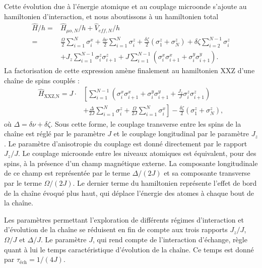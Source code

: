 Cette évolution due à l'énergie atomique et au couplage microonde s'ajoute au hamiltonien d'interaction, et nous aboutissons à un hamiltonien total
%
\begin{equation}
\label{eq:hamilt_tot_N}
\begin{aligned}
\hat{H}/h =& %
\hat{H}_{\mu o,N}/h + \hat{V}_{eff,N}/h \\
=&
\frac{\Omega}{2}\sum_{i=1}^{N}\sigma_i^x +
\frac{\delta\nu}{2}\sum_{i=1}^{N}\sigma_i^z 
+\frac{\delta\zeta}{2} \left( \sigma_1^z + \sigma_N^z \right)
+ \delta\zeta \sum_{i=2}^{N-1} \sigma_i^z \\
&+ J_z \sum_{i=1}^{N-1} \sigma_i^z \sigma_{i+1}^z
+ J \sum_{i=1}^{N-1} \left( \sigma_i^x \sigma_{i+1}^x + \sigma_i^y \sigma_{i+1}^y \right).
\end{aligned}
\end{equation}
%
La factorisation de cette expression amène finalement au hamiltonien \og XXZ \fg{} d'une chaîne de spins couplés :
\begin{equation}
\label{eq:XXZ_Natoms}
\begin{aligned}
\hat{H}_{\text{XXZ,N}} =
J\cdot & \left[
\sum_{i=1}^{N-1} \left( \sigma_i^x\sigma_{i+1}^x 
+ \sigma_i^y \sigma_{i+1}^y
+ \frac{J_z}{J} \sigma_i^z\sigma_{i+1}^z \right) \right. \\
&\left. + \frac{\Delta}{2J}\sum_{i=1}^{N} \sigma_i^z
+ \frac{\Omega}{2J}\sum_{i=1}^{N} \sigma_i^x \right]
- \frac{\delta\zeta}{2}\left( \sigma_1^z + \sigma_N^z \right),
\end{aligned}
\end{equation}
où $\Delta=\delta\nu+\delta\zeta$.
Sous cette forme, le couplage transverse entre les spins de la chaîne est réglé par le paramètre $J$ et le couplage longitudinal par le paramètre $J_z$.
Le paramètre d'anisotropie du couplage est donné directement par le rapport $J_z/J$.
Le couplage microonde entre les niveaux atomiques est équivalent, pour des spins, à la présence d'un champ magnétique externe.
La composante longitudinale de ce \og champ \fg{} est représentée par le terme $\Delta/(2J)$ et sa composante transverse par le terme $\Omega/(2J)$.
Le dernier terme du hamiltonien représente l'effet de bord de la chaîne évoqué plus haut, qui déplace l'énergie des atomes à chaque bout de la chaîne.

Les paramètres permettant l'exploration de différents régimes d'interaction et d'évolution de la chaîne se réduisent en fin de compte aux trois rapports $J_z/J$, $\Omega/J$ et $\Delta/J$.
Le paramètre $J$, qui rend compte de l'interaction d'échange, règle quant à lui le temps caractéristique d'évolution de la chaîne.
Ce temps est donné par $\tau_{\text{\'ech}} = 1/(4J)$.

